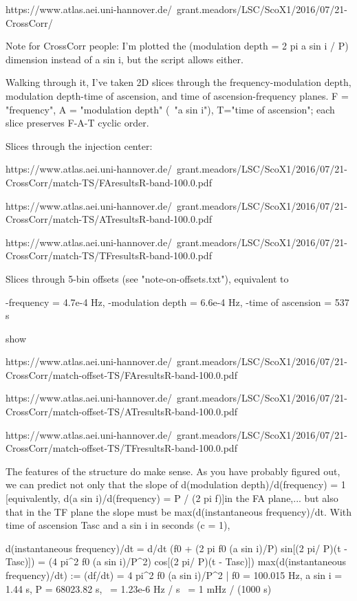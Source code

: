 \documentclass{article}
\begin{document}
https://www.atlas.aei.uni-hannover.de/~grant.meadors/LSC/ScoX1/2016/07/21-CrossCorr/

Note for CrossCorr people: I'm plotted the (modulation depth = 2 pi a
sin i / P) dimension instead of a sin i, but the script allows either.

Walking through it, I've taken 2D slices through the
frequency-modulation depth, modulation depth-time of ascension, and time
of ascension-frequency planes. F = "frequency", A = "modulation depth"
(~"a sin i"), T="time of ascension"; each slice preserves F-A-T cyclic
order.

Slices through the injection center:

https://www.atlas.aei.uni-hannover.de/~grant.meadors/LSC/ScoX1/2016/07/21-CrossCorr/match-TS/FAresultsR-band-100.0.pdf

https://www.atlas.aei.uni-hannover.de/~grant.meadors/LSC/ScoX1/2016/07/21-CrossCorr/match-TS/ATresultsR-band-100.0.pdf

https://www.atlas.aei.uni-hannover.de/~grant.meadors/LSC/ScoX1/2016/07/21-CrossCorr/match-TS/TFresultsR-band-100.0.pdf

Slices through 5-bin offsets (see "note-on-offsets.txt"), equivalent to

    -frequency = 4.7e-4 Hz,
    -modulation depth = 6.6e-4 Hz,
    -time of ascension = 537 s

show

https://www.atlas.aei.uni-hannover.de/~grant.meadors/LSC/ScoX1/2016/07/21-CrossCorr/match-offset-TS/FAresultsR-band-100.0.pdf

https://www.atlas.aei.uni-hannover.de/~grant.meadors/LSC/ScoX1/2016/07/21-CrossCorr/match-offset-TS/ATresultsR-band-100.0.pdf

https://www.atlas.aei.uni-hannover.de/~grant.meadors/LSC/ScoX1/2016/07/21-CrossCorr/match-offset-TS/TFresultsR-band-100.0.pdf

The features of the structure do make sense. As you have probably
figured out, we can predict not only that the slope of d(modulation
depth)/d(frequency) = 1 [equivalently, d(a sin i)/d(frequency) = P / (2
pi f)]in the FA plane,...
    but also that in the TF plane the slope must be max(d(instantaneous
frequency)/dt. With time of ascension Tasc and a sin i in seconds (c = 1),

  d(instantaneous frequency)/dt
      = d/dt (f0 + (2 pi f0 (a sin i)/P) sin[(2 pi/ P)(t - Tasc)])
      = (4 pi^2 f0 (a sin i)/P^2) cos[(2 pi/ P)(t - Tasc)])
  max(d(instantaneous frequency)/dt)
      := (df/dt)
      = 4 pi^2 f0 (a sin i)/P^2
      | f0 = 100.015 Hz, a sin i = 1.44 s, P = 68023.82 s,
      ~= 1.23e-6 Hz / s
      ~= 1 mHz / (1000 s)
\end{document}
